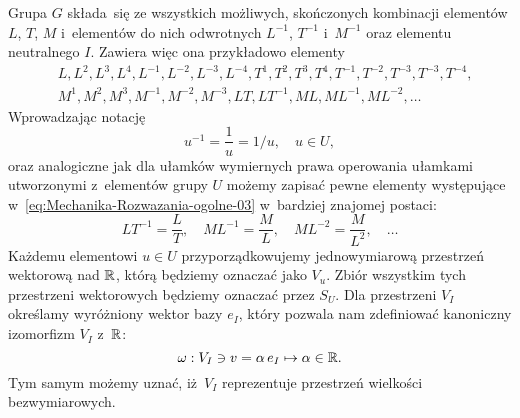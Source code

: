 \documentclass[a4paper,11pt]{article}
\numberwithin{equation}{section}
\begin{document}
Grupa $G$ składa~się ze wszystkich możliwych, skończonych kombinacji
elementów $L$, $T$, $M$ i~elementów do nich odwrotnych $L^{ -1 }$, $T^{ -1 }$
i~$M^{ -1 }$ oraz elementu neutralnego $I$. Zawiera więc ona przykładowo
elementy
\begin{equation}
  \label{eq:Mechanika-Rozwazania-ogolne-03}
  \begin{split}
    &L, L^{ 2 }, L^{ 3 }, L^{ 4 }, L^{ -1 }, L^{ -2 }, L^{ -3 }, L^{ -4 },
      T^{ 1 }, T^{ 2 }, T^{ 3 }, T^{ 4 }, T^{ -1 }, T^{ -2 }, T^{ -3 },
      T^{ -3 }, T^{ -4 }, \\
    &M^{ 1 }, M^{ 2 }, M^{ 3 }, M^{ -1 }, M^{ -2 }, M^{ -3 },
    L T, L T^{ -1 }, M L, M L^{ -1 }, M L^{ -2 }, \ldots
  \end{split}
\end{equation}
Wprowadzając notację
\begin{equation}
  \label{eq:Mechanika-Rozwazania-ogolne-04}
  u^{ -1 } = \frac{ 1 }{ u } = 1 / u, \quad u \in U,
\end{equation}
oraz analogiczne jak dla ułamków wymiernych prawa operowania ułamkami
utworzonymi z~elementów grupy $U$ możemy zapisać pewne elementy
występujące w~\eqref{eq:Mechanika-Rozwazania-ogolne-03} w~bardziej znajomej
postaci:
\begin{equation}
  \label{eq:Mechanika-Rozwazania-ogolne-05}
  L T^{ -1 } = \frac{ L }{ T }, \quad
  M L^{ -1 } = \frac{ M }{ L }, \quad
  M L^{ -2 } = \frac{ M }{ L^{ 2 } }, \quad \ldots
\end{equation}
Każdemu elementowi $u \in U$ przyporządkowujemy jednowymiarową przestrzeń
wektorową nad $\mathbb{R}$, którą będziemy oznaczać jako $V_{ u }$. Zbiór
wszystkim tych przestrzeni wektorowych będziemy oznaczać przez $S_{ U }$.
Dla przestrzeni $V_{ I }$ określamy wyróżniony wektor bazy $e_{ I }$, który
pozwala nam zdefiniować kanoniczny izomorfizm $V_{ I }$ z~$\mathbb{R}$:
\begin{equation}
  \label{eq:Mechanika-Rozwazania-ogolne-06}
  \omega : V_{ I } \ni v = \alpha \, e_{ I } \mapsto \alpha \in \mathbb{R}.
\end{equation}
Tym samym możemy uznać, iż~$V_{ I }$ reprezentuje przestrzeń wielkości
bezwymiarowych.
\end{document}

